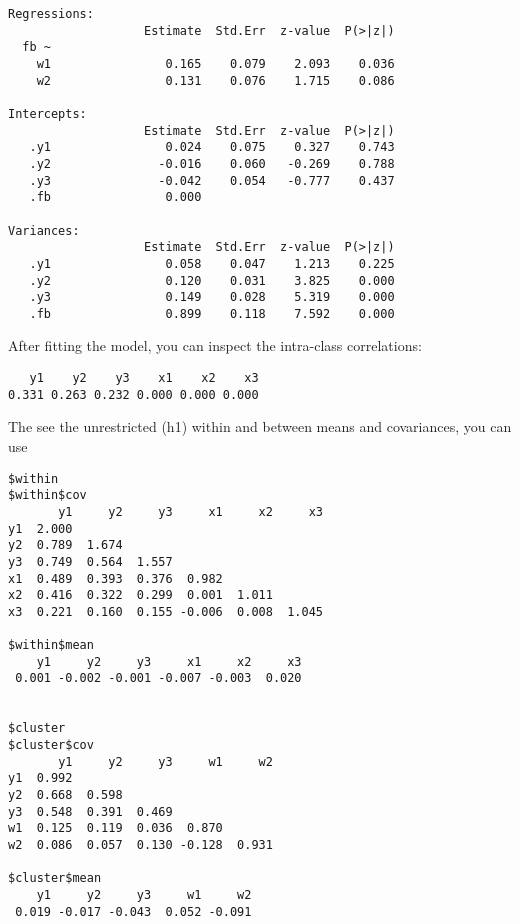 \begin{verbatim}
Regressions:
                   Estimate  Std.Err  z-value  P(>|z|)
  fb ~                                                
    w1                0.165    0.079    2.093    0.036
    w2                0.131    0.076    1.715    0.086

Intercepts:
                   Estimate  Std.Err  z-value  P(>|z|)
   .y1                0.024    0.075    0.327    0.743
   .y2               -0.016    0.060   -0.269    0.788
   .y3               -0.042    0.054   -0.777    0.437
   .fb                0.000                           

Variances:
                   Estimate  Std.Err  z-value  P(>|z|)
   .y1                0.058    0.047    1.213    0.225
   .y2                0.120    0.031    3.825    0.000
   .y3                0.149    0.028    5.319    0.000
   .fb                0.899    0.118    7.592    0.000
\end{verbatim}

After fitting the model, you can inspect the intra-class correlations:

\begin{Shaded}
\begin{Highlighting}[]
\NormalTok{)}
\end{Highlighting}
\end{Shaded}

\begin{verbatim}
   y1    y2    y3    x1    x2    x3 
0.331 0.263 0.232 0.000 0.000 0.000 
\end{verbatim}

The see the unrestricted (h1) within and between means and covariances,
you can use

\begin{Shaded}
\begin{Highlighting}[]
\NormalTok{)}
\end{Highlighting}
\end{Shaded}

\begin{verbatim}
$within
$within$cov
       y1     y2     y3     x1     x2     x3
y1  2.000                                   
y2  0.789  1.674                            
y3  0.749  0.564  1.557                     
x1  0.489  0.393  0.376  0.982              
x2  0.416  0.322  0.299  0.001  1.011       
x3  0.221  0.160  0.155 -0.006  0.008  1.045

$within$mean
    y1     y2     y3     x1     x2     x3 
 0.001 -0.002 -0.001 -0.007 -0.003  0.020 


$cluster
$cluster$cov
       y1     y2     y3     w1     w2
y1  0.992                            
y2  0.668  0.598                     
y3  0.548  0.391  0.469              
w1  0.125  0.119  0.036  0.870       
w2  0.086  0.057  0.130 -0.128  0.931

$cluster$mean
    y1     y2     y3     w1     w2 
 0.019 -0.017 -0.043  0.052 -0.091 
\end{verbatim}

